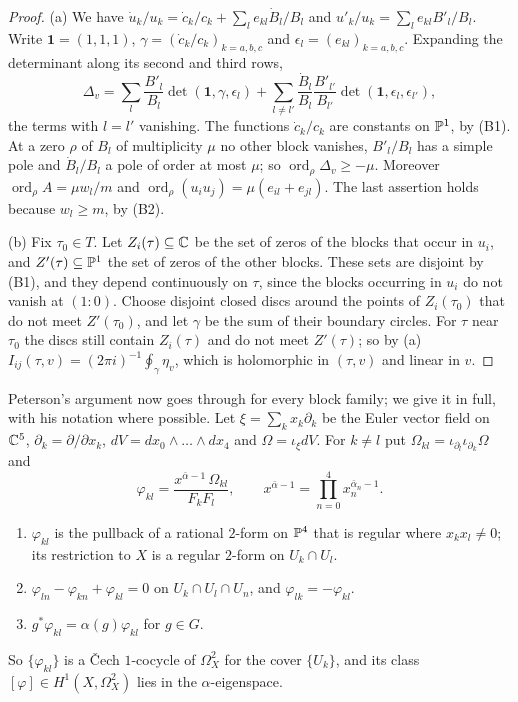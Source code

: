\begin{proof}
(a) We have $\dot u_{k}/u_{k}=\dot c_{k}/c_{k}+\sum_{l}e_{kl}\dot B_{l}/B_{l}$
and $u'_{k}/u_{k}=\sum_{l}e_{kl}B'_{l}/B_{l}$. Write $\mathbf1=(1,1,1)$,
$\gamma=(\dot c_{k}/c_{k})_{k=a,b,c}$ and $\epsilon_{l}=(e_{kl})_{k=a,b,c}$.
Expanding the determinant along its second and third rows,
\[
  \Delta_{v}=\sum_{l}\frac{B'_{l}}{B_{l}}\det(\mathbf1,\gamma,\epsilon_{l})
  +\sum_{l\ne l'}\frac{\dot B_{l}}{B_{l}}\frac{B'_{l'}}{B_{l'}}
  \det(\mathbf1,\epsilon_{l},\epsilon_{l'}),
\]
the terms with $l=l'$ vanishing. The functions $\dot c_{k}/c_{k}$ are
constants on $\mathbb{P}^{1}$, by (B1). At a zero $\rho$ of $B_{l}$ of
multiplicity $\mu$ no other block vanishes, $B'_{l}/B_{l}$ has a simple pole
and $\dot B_{l}/B_{l}$ a pole of order at most $\mu$; so
$\operatorname{ord}_{\rho}\Delta_{v}\ge-\mu$. Moreover
$\operatorname{ord}_{\rho}A=\mu w_{l}/m$ and $\operatorname{ord}_{\rho}
(u_{i}u_{j})=\mu(e_{il}+e_{jl})$. The last assertion holds because
$w_{l}\ge m$, by (B2).

(b) Fix $\tau_{0}\in T$. Let $Z_{i}(\tau)\subseteq\mathbb{C}$ be the set of zeros
of the blocks that occur in $u_{i}$, and $Z'(\tau)\subseteq\mathbb{P}^{1}$ the set
of zeros of the other blocks. These sets are disjoint by (B1), and they
depend continuously on $\tau$, since the blocks occurring in $u_{i}$ do not
vanish at $(1:0)$. Choose disjoint closed discs around the points of
$Z_{i}(\tau_{0})$ that do not meet $Z'(\tau_{0})$, and let $\gamma$ be the
sum of their boundary circles. For $\tau$ near $\tau_{0}$ the discs still
contain $Z_{i}(\tau)$ and do not meet $Z'(\tau)$; so by (a)
$I_{ij}(\tau,v)=(2\pi i)^{-1}\oint_{\gamma}\eta_{v}$, which is holomorphic in
$(\tau,v)$ and linear in $v$.
\end{proof}

Peterson's argument now goes through for every block family; we give it in
full, with his notation where possible. Let $\xi=\sum_{k}x_{k}\partial_{k}$
be the Euler vector field on $\mathbb{C}^{5}$, $\partial_{k}=\partial/\partial
x_{k}$, $dV=dx_{0}\wedge\dots\wedge dx_{4}$ and $\Omega=\iota_{\xi}dV$. For
$k\ne l$ put $\Omega_{kl}=\iota_{\partial_{l}}\iota_{\partial_{k}}\Omega$ and
\[
  \varphi_{kl}=\frac{x^{\bar\alpha-1}\,\Omega_{kl}}{F_{k}F_{l}},\qquad
  x^{\bar\alpha-1}=\prod_{n=0}^{4}x_{n}^{\bar\alpha_{n}-1}.
\]

\begin{lemma}\label{lem:cocyclegen}
\begin{enumerate}[label=\textup{(\alph*)}]
\item $\varphi_{kl}$ is the pullback of a rational $2$-form on $\mathbb{P}^{4}$
that is regular where $x_{k}x_{l}\ne0$; its restriction to $X$ is a regular
$2$-form on $U_{k}\cap U_{l}$.
\item $\varphi_{ln}-\varphi_{kn}+\varphi_{kl}=0$ on $U_{k}\cap U_{l}\cap
U_{n}$, and $\varphi_{lk}=-\varphi_{kl}$.
\item $g^{*}\varphi_{kl}=\alpha(g)\varphi_{kl}$ for $g\in G$.
\end{enumerate}
So $\{\varphi_{kl}\}$ is a \v{C}ech $1$-cocycle of $\Omega^{2}_{X}$ for the
cover $\{U_{k}\}$, and its class $[\varphi]\in H^{1}(X,\Omega^{2}_{X})$ lies
in the $\alpha$-eigenspace.
\end{lemma}

